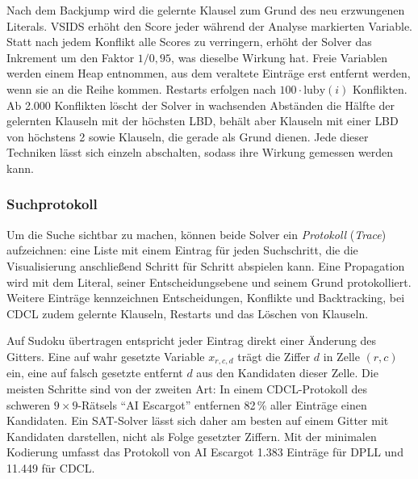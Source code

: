 Nach dem Backjump wird die gelernte Klausel zum Grund des neu erzwungenen Literals.
\acs{VSIDS} erhöht den Score jeder während der Analyse markierten Variable.
Statt nach jedem Konflikt alle Scores zu verringern, erhöht der Solver das Inkrement um den Faktor $1/0{,}95$, was dieselbe Wirkung hat.
Freie Variablen werden einem Heap entnommen, aus dem veraltete Einträge erst entfernt werden, wenn sie an die Reihe kommen.
Restarts erfolgen nach $100 \cdot \mathrm{luby}(i)$ Konflikten.
Ab 2.000 Konflikten löscht der Solver in wachsenden Abständen die Hälfte der gelernten Klauseln mit der höchsten \acs{LBD}, behält aber Klauseln mit einer \acs{LBD} von höchstens 2 sowie Klauseln, die gerade als Grund dienen.
Jede dieser Techniken lässt sich einzeln abschalten, sodass ihre Wirkung gemessen werden kann.

\subsubsection{Suchprotokoll} \label{sec:trace}

Um die Suche sichtbar zu machen, können beide Solver ein \emph{Protokoll} (\emph{Trace}) aufzeichnen: eine Liste mit einem Eintrag für jeden Suchschritt, die die Visualisierung anschließend Schritt für Schritt abspielen kann.
Eine Propagation wird mit dem Literal, seiner Entscheidungsebene und seinem Grund protokolliert.
Weitere Einträge kennzeichnen Entscheidungen, Konflikte und Backtracking, bei \acs{CDCL} zudem gelernte Klauseln, Restarts und das Löschen von Klauseln.

Auf Sudoku übertragen entspricht jeder Eintrag direkt einer Änderung des Gitters.
Eine auf wahr gesetzte Variable $x_{r,c,d}$ trägt die Ziffer $d$ in Zelle $(r, c)$ ein, eine auf falsch gesetzte entfernt $d$ aus den Kandidaten dieser Zelle.
Die meisten Schritte sind von der zweiten Art: In einem \acs{CDCL}-Protokoll des schweren $9 \times 9$-Rätsels \enquote{AI Escargot} entfernen 82\,\% aller Einträge einen Kandidaten.
Ein \acs{SAT}-Solver lässt sich daher am besten auf einem Gitter mit Kandidaten darstellen, nicht als Folge gesetzter Ziffern.
Mit der minimalen Kodierung umfasst das Protokoll von AI Escargot 1.383 Einträge für DPLL und 11.449 für \acs{CDCL}.
